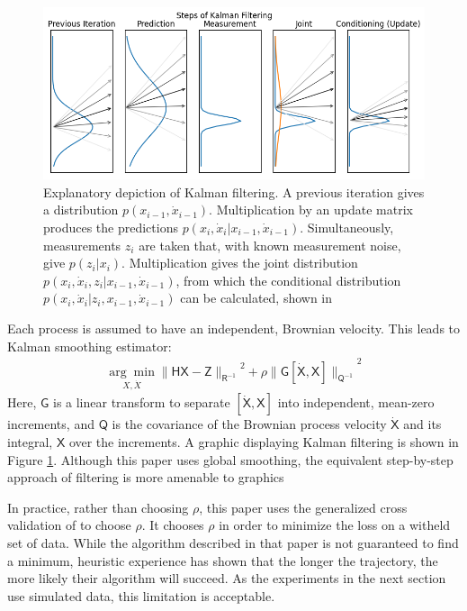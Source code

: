 \documentclass{article}
\newcommand{\mat}[1]{\boldsymbol{\mathsf{#1}}}
\begin{document}
\begin{figure}
    \label{fig:kalman}
    \centering
    \includegraphics[width=\textwidth]{images/static/kalman_fit_demo2.png}
    \caption{Explanatory depiction of Kalman filtering.
    A previous iteration gives a distribution $p(x_{i-1},\dot x_{i-1})$.
    Multiplication by an update matrix produces the predictions $p(x_i, \dot x_i|x_{i-1}, \dot x_{i-1})$.
    Simultaneously, measurements $z_i$ are taken that, with known measurement noise, give $p(z_i|x_i)$.
    Multiplication gives the joint distribution $p(x_i, \dot x_i, z_i| x_{i-1}, \dot x_{i-1})$, from which the conditional distribution $p(x_i, \dot x_i|z_i, x_{i-1}, \dot x_{i-1})$ can be calculated, shown in \cite{Eaton2007}}
\end{figure}


Each process is assumed to have an independent, Brownian velocity.  This leads to Kalman smoothing estimator:
\begin{align}
    \label{eqn:kalman}
    \underset{X, \dot X}{\arg\min}{\|\mat H \mat X - \mat Z\|_{\mat R^{-1}}}^2 + \rho {\|\mat G [\mat {\dot X}, \mat X]\|_{\mat Q^{-1}}}^2
\end{align}
Here, $\mat G$ is a linear transform to separate $[\mat{\dot X}, \mat X]$ into independent, mean-zero increments, and $\mat Q$ is the covariance of the Brownian process velocity $\mat{\dot X}$ and its integral, $\mat X$ over the increments.  A graphic displaying Kalman filtering is shown in Figure \ref{fig:kalman}.  Although this paper uses global smoothing, the equivalent step-by-step approach of filtering is more amenable to graphics

In practice, rather than choosing $\rho$, this paper uses the generalized cross validation of \cite{Barratt2020} to choose $\rho$.  It chooses $\rho$ in order to minimize the loss on a witheld set of data.  While the algorithm described in that paper is not guaranteed to find a minimum, heuristic experience has shown that the longer the trajectory, the more likely their algorithm will succeed.  As the experiments in the next section use simulated data, this limitation is acceptable.
\end{document}
